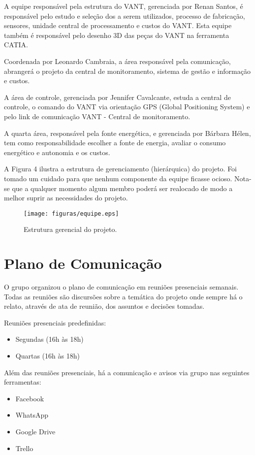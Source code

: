 A equipe responsável pela estrutura do VANT, gerenciada por Renan Santos, é responsável pelo estudo e seleção dos a serem utilizados, processo de fabricação, sensores, unidade central de processamento e custos do VANT. Esta equipe também é responsável pelo desenho 3D das peças do VANT na ferramenta CATIA.  
	
Coordenada por Leonardo Cambraia, a área responsável pela comunicação, abrangerá o projeto da central de monitoramento, sistema de gestão e informação e custos.
	
A área de controle, gerenciada por Jennifer Cavalcante, estuda a central de controle, o comando do VANT via orientação GPS (Global Positioning System) e pelo link de comunicação VANT - Central de monitoramento.
	
A quarta área, responsável pela fonte energética, e gerenciada por Bárbara Hélen, tem como responsabilidade escolher a fonte de energia, avaliar o consumo energético e autonomia e os custos.
	
A Figura 4 ilustra a estrutura de gerenciamento (hierárquica) do projeto. Foi tomado um cuidado para que nenhum componente da equipe ficasse ocioso. Nota-se que a qualquer momento algum membro poderá ser realocado de modo a melhor suprir as necessidades do projeto.

\begin{figure}[ht]
	\centering
		\texttt{[image: figuras/equipe.eps]}
	\caption{Estrutura gerencial do projeto.}
\end{figure}

\section{Plano de Comunicação}
O grupo organizou o plano de comunicação em reuniões presenciais semanais. Todas as reuniões são discursões sobre a temática do projeto onde sempre há o relato, através de ata de reunião, dos assuntos e decisões tomadas. 

Reuniões presenciais predefinidas:
\begin{itemize}
	\item Segundas (16h às 18h)
	\item Quartas (16h às 18h)
\end{itemize}

Além das reuniões presenciais, há a comunicação e avisos via grupo nas seguintes ferramentas:
\begin{itemize}
	\item Facebook
	\item WhatsApp
	\item Google Drive
	\item Trello
\end{itemize}

